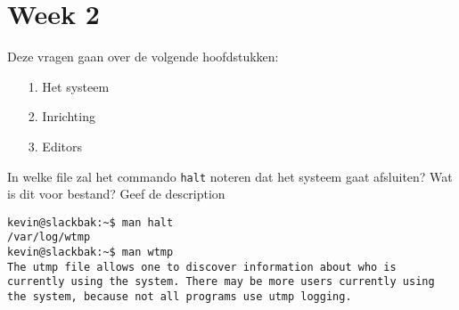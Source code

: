 %
%
%
%

\section{Week 2}
Deze vragen gaan over de volgende hoofdstukken:
\begin{itemize}
\item[1.] Het systeem
\item[2.] Inrichting
\item[3.] Editors
\end{itemize}

\question[10] In welke file zal het commando \texttt{halt} noteren dat het systeem gaat afsluiten? Wat is dit voor bestand? Geef de description
\begin{solution}
\begin{lstlisting}
kevin@slackbak:~$ man halt
/var/log/wtmp
kevin@slackbak:~$ man wtmp
The utmp file allows one to discover information about who is currently using the system. There may be more users currently using the system, because not all programs use utmp logging.
\end{lstlisting}
\end{solution}

